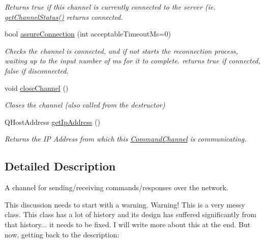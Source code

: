 \begin{DoxyCompactItemize}
\begin{DoxyCompactList}\small\item\em Returns true if this channel is currently connected to the server (ie. \hyperlink{class_picto_1_1_command_channel_a0ec9175282cb98e99ece960376f3da12}{get\-Channel\-Status()} returns connected. \end{DoxyCompactList}\item 
bool \hyperlink{class_picto_1_1_command_channel_a785fa9b2dccc12b6419dc9d8be3d2e21}{assure\-Connection} (int acceptable\-Timeout\-Ms=0)
\begin{DoxyCompactList}\small\item\em Checks the channel is connected, and if not starts the reconnection process, waiting up to the input number of ms for it to complete. returns true if connected, false if disconnected. \end{DoxyCompactList}\item 
void \hyperlink{class_picto_1_1_command_channel_a9f3c41d62b857a6ba81c55ab6aaa4a8f}{close\-Channel} ()
\begin{DoxyCompactList}\small\item\em Closes the channel (also called from the destructor) \end{DoxyCompactList}\item 
\hypertarget{class_picto_1_1_command_channel_aaa613e72eff7d7b2b01707350c5ca588}{Q\-Host\-Address \hyperlink{class_picto_1_1_command_channel_aaa613e72eff7d7b2b01707350c5ca588}{get\-Ip\-Address} ()}\label{class_picto_1_1_command_channel_aaa613e72eff7d7b2b01707350c5ca588}

\begin{DoxyCompactList}\small\item\em Returns the I\-P Address from which this \hyperlink{class_picto_1_1_command_channel}{Command\-Channel} is communicating. \end{DoxyCompactList}\end{DoxyCompactItemize}


\subsection{Detailed Description}
A channel for sending/receiving commands/responses over the network. 

This discussion needs to start with a warning. Warning! This is a very messy class. This class has a lot of history and its design has suffered significantly from that history... it needs to be fixed. I will write more about this at the end. But now, getting back to the description\-:

